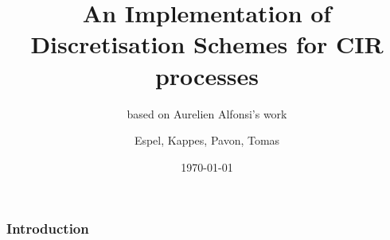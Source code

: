 \documentclass{beamer}
\title{An Implementation of Discretisation Schemes for CIR processes}
\subtitle{based on Aurelien Alfonsi's work}
\author{Espel, Kappes, Pavon, Tomas}
\institute{Imperial College London}
\date{\today}
\begin{document}
\begin{frame}
    \titlepage
\end{frame}

\begin{frame}
\frametitle{Introduction}
\end{frame}
\end{document}
